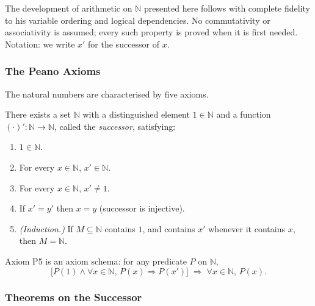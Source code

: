 The development of arithmetic on $\mathbb{N}$ presented here follows
\cite{LandauFoundationsAnalysis} with complete fidelity to his variable
ordering and logical dependencies. No commutativity or associativity is
assumed; every such property is proved when it is first needed.
Notation: we write $x'$ for the successor of $x$.

\subsubsection*{The Peano Axioms}

The natural numbers are characterised by five axioms.

\begin{axiom}
\label{ax:landau-peano}
There exists a set $\mathbb{N}$ with a distinguished element $1 \in \mathbb{N}$
and a function $(\cdot)' : \mathbb{N} \to \mathbb{N}$, called the
\emph{successor}, satisfying:
\begin{enumerate}
  \item[\textbf{P1.}] $1 \in \mathbb{N}$.
  \item[\textbf{P2.}] For every $x \in \mathbb{N}$, $x' \in \mathbb{N}$.
  \item[\textbf{P3.}] For every $x \in \mathbb{N}$, $x' \neq 1$.
  \item[\textbf{P4.}] If $x' = y'$ then $x = y$ \quad (successor is injective).
  \item[\textbf{P5.}] \emph{(Induction.)} If $M \subseteq \mathbb{N}$ contains
        $1$, and contains $x'$ whenever it contains $x$, then
        $M = \mathbb{N}$.
\end{enumerate}
\end{axiom}

\begin{remark*}
Axiom P5 is an axiom schema: for any predicate $P$ on $\mathbb{N}$,
\[
  \bigl[P(1) \land \forall x \in \mathbb{N},\, P(x) \Rightarrow P(x')\bigr]
  \;\Rightarrow\;
  \forall x \in \mathbb{N},\, P(x).
\]
\end{remark*}

\subsubsection*{Theorems on the Successor}

